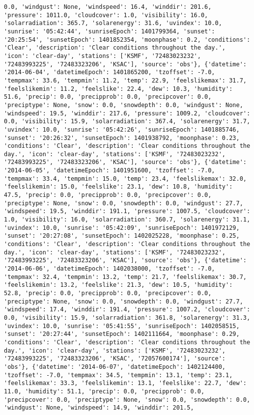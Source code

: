 \documentclass[
  letterpaper,
  DIV=11,
  numbers=noendperiod]{scrartcl}
\begin{document}
\begin{verbatim}
0.0, 'windgust': None, 'windspeed': 16.4, 'winddir': 201.6, 'pressure': 1011.0, 'cloudcover': 1.0, 'visibility': 16.0, 'solarradiation': 365.7, 'solarenergy': 31.6, 'uvindex': 10.0, 'sunrise': '05:42:44', 'sunriseEpoch': 1401799364, 'sunset': '20:25:54', 'sunsetEpoch': 1401852354, 'moonphase': 0.2, 'conditions': 'Clear', 'description': 'Clear conditions throughout the day.', 'icon': 'clear-day', 'stations': ['KSMF', '72483023232', '72483993225', '72483323206', 'KSAC'], 'source': 'obs'}, {'datetime': '2014-06-04', 'datetimeEpoch': 1401865200, 'tzoffset': -7.0, 'tempmax': 33.6, 'tempmin': 11.2, 'temp': 22.9, 'feelslikemax': 31.7, 'feelslikemin': 11.2, 'feelslike': 22.4, 'dew': 10.3, 'humidity': 51.6, 'precip': 0.0, 'precipprob': 0.0, 'precipcover': 0.0, 'preciptype': None, 'snow': 0.0, 'snowdepth': 0.0, 'windgust': None, 'windspeed': 19.5, 'winddir': 217.6, 'pressure': 1009.2, 'cloudcover': 0.0, 'visibility': 15.9, 'solarradiation': 367.4, 'solarenergy': 31.7, 'uvindex': 10.0, 'sunrise': '05:42:26', 'sunriseEpoch': 1401885746, 'sunset': '20:26:32', 'sunsetEpoch': 1401938792, 'moonphase': 0.23, 'conditions': 'Clear', 'description': 'Clear conditions throughout the day.', 'icon': 'clear-day', 'stations': ['KSMF', '72483023232', '72483993225', '72483323206', 'KSAC'], 'source': 'obs'}, {'datetime': '2014-06-05', 'datetimeEpoch': 1401951600, 'tzoffset': -7.0, 'tempmax': 33.4, 'tempmin': 15.0, 'temp': 23.4, 'feelslikemax': 32.0, 'feelslikemin': 15.0, 'feelslike': 23.1, 'dew': 10.8, 'humidity': 47.5, 'precip': 0.0, 'precipprob': 0.0, 'precipcover': 0.0, 'preciptype': None, 'snow': 0.0, 'snowdepth': 0.0, 'windgust': 27.7, 'windspeed': 19.5, 'winddir': 191.1, 'pressure': 1007.5, 'cloudcover': 1.0, 'visibility': 16.0, 'solarradiation': 360.7, 'solarenergy': 31.1, 'uvindex': 10.0, 'sunrise': '05:42:09', 'sunriseEpoch': 1401972129, 'sunset': '20:27:08', 'sunsetEpoch': 1402025228, 'moonphase': 0.25, 'conditions': 'Clear', 'description': 'Clear conditions throughout the day.', 'icon': 'clear-day', 'stations': ['KSMF', '72483023232', '72483993225', '72483323206', 'KSAC'], 'source': 'obs'}, {'datetime': '2014-06-06', 'datetimeEpoch': 1402038000, 'tzoffset': -7.0, 'tempmax': 32.4, 'tempmin': 13.2, 'temp': 21.7, 'feelslikemax': 30.7, 'feelslikemin': 13.2, 'feelslike': 21.3, 'dew': 10.5, 'humidity': 52.8, 'precip': 0.0, 'precipprob': 0.0, 'precipcover': 0.0, 'preciptype': None, 'snow': 0.0, 'snowdepth': 0.0, 'windgust': 27.7, 'windspeed': 17.4, 'winddir': 191.4, 'pressure': 1007.2, 'cloudcover': 0.0, 'visibility': 15.9, 'solarradiation': 361.8, 'solarenergy': 31.3, 'uvindex': 10.0, 'sunrise': '05:41:55', 'sunriseEpoch': 1402058515, 'sunset': '20:27:44', 'sunsetEpoch': 1402111664, 'moonphase': 0.29, 'conditions': 'Clear', 'description': 'Clear conditions throughout the day.', 'icon': 'clear-day', 'stations': ['KSMF', '72483023232', '72483993225', '72483323206', 'KSAC', '72057600174'], 'source': 'obs'}, {'datetime': '2014-06-07', 'datetimeEpoch': 1402124400, 'tzoffset': -7.0, 'tempmax': 34.5, 'tempmin': 13.1, 'temp': 23.1, 'feelslikemax': 33.3, 'feelslikemin': 13.1, 'feelslike': 22.7, 'dew': 11.0, 'humidity': 51.1, 'precip': 0.0, 'precipprob': 0.0, 'precipcover': 0.0, 'preciptype': None, 'snow': 0.0, 'snowdepth': 0.0, 'windgust': None, 'windspeed': 14.9, 'winddir': 201.5, 
\end{verbatim}
\end{document}
